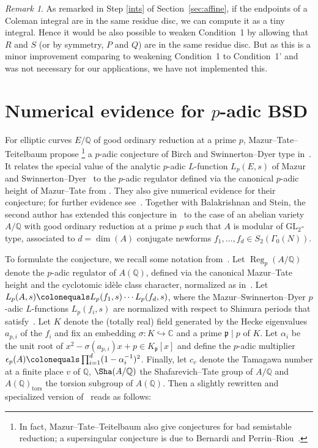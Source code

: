 \documentclass[11pt, a4paper]{amsart}
\newcommand{\Q}{\mathbb{Q}}
\newcommand{\C}{\mathbb{C}}
\newcommand{\p}{\mathfrak{p}}
\newcommand{\tors}{\operatorname{tors}}
\newcommand{\Reg}{\operatorname{Reg}}
\theoremstyle{remark}
\newtheorem{remark}[theorem]{Remark}
\numberwithin{equation}{section}
\begin{document}
  \begin{remark}\label{R:} 
As remarked in Step \eqref{ints} of Section~\ref{sec:affine}, if the
endpoints of a Coleman integral are in the same residue disc, we can
compute it as a tiny integral. Hence it would be also possible to weaken
Condition~1 by allowing that $R$ and $S$ (or by symmetry, $P$ and
$Q$) are in the same residue disc. But as this is a minor improvement
comparing to weakening Condition~1 to Condition~1' and
was not necessary for our applications, we have not implemented this.
  \end{remark}




\section{Numerical evidence for $p$-adic BSD}\label{S:pbsd}

For elliptic curves $E/\Q$ of good ordinary reduction at a prime $p$,
Mazur--Tate--Teitelbaum propose 
\footnote{In fact, Mazur--Tate--Teitelbaum also give conjectures for bad
semistable reduction; a supersingular conjecture is due to Bernardi and
Perrin--Riou~\cite{BPR93}.} 
a $p$-adic conjecture of Birch and
Swinnerton--Dyer type in~\cite{MTT86}. It relates the special value of the 
analytic $p$-adic $L$-function $L_p(E,s)$ of
Mazur and Swinnerton--Dyer~\cite{MSD74} to the $p$-adic regulator
defined via the canonical $p$-adic height of Mazur--Tate from \cite{Mazur-Tate-p-adic-heights}. They also give numerical
evidence for their conjecture; for further evidence see~\cite{SW13}.
Together with Balakrishnan and Stein, the second author has
extended this conjecture
in~\cite{BMS16} to the case of an abelian variety $A/\Q$ with good ordinary
reduction at a prime $p$ such that $A$ is modular
of $\mathrm{GL}_2$-type, associated to $d=\dim(A)$ conjugate newforms
$f_1,\ldots, f_d \in S_2(\Gamma_0(N))$. 

To formulate the conjecture, we recall some notation
from~\cite{BMS16}.
Let $\Reg_p(A/\Q)$ denote the $p$-adic regulator of $A(\Q)$, defined via
the canonical Mazur--Tate height and the cyclotomic idèle class character,
normalized as in~\cite[Definition~3.3]{BMS16}.
Let $L_p(A,s)\colonequals L_p(f_1,s)\cdots L_p(f_d,s)$, where the
Mazur--Swinnerton--Dyer $p$-adic $L$-functions $L_p(f_i,
s)$ are normalized with respect to Shimura periods that
satisfy~\cite[Theorem~2.4]{BMS16}. 
Let $K$ denote the (totally real)
field generated by the Hecke eigenvalues $a_{p,i}$ of the $f_i$ and fix an embedding
$\sigma\colon K\hookrightarrow\C$ and a prime $\p\mid p$ of $K$. Let $\alpha_i$ be the unit root of 
$x^2-\sigma(a_{p,i})x+p \in K_\p[x]$ and define 
the $p$-adic multiplier $\epsilon_p(A)\colonequals \prod_{i=1}^d(1-\alpha^{-1}_i)^2$.  
Finally, let $c_v$ denote the
    Tamagawa number at a finite place $v$ of $\Q$, $\Sha(A/\Q)$ the
    Shafarevich--Tate
group of $A/\Q$ and $A(\Q)_{\tors}$ the torsion subgroup of $A(\Q)$.
Then a slightly rewritten and specialized version
of~\cite[Conjecture~1.4]{BMS16} reads as follows:
\end{document}
